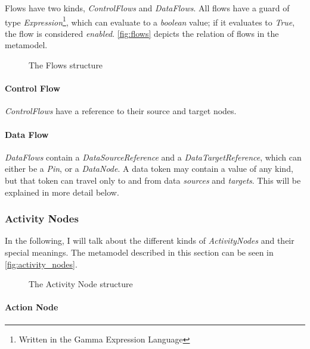 Flows have two kinds, \emph{ControlFlows} and \emph{DataFlows}. All flows have a guard of type \emph{Expression}\footnote{Written in the Gamma Expression Language}, which can evaluate to a \emph{boolean} value; if it evaluates to \emph{True}, the flow is considered \emph{enabled}. \autoref{fig:flows} depicts the relation of flows in the metamodel.

\begin{figure}[!ht]
	\centering
	
	\caption{The Flows structure}
	\label{fig:flows}
\end{figure}

\paragraph{Control Flow}

\emph{ControlFlows} have a reference to their source and target nodes.

\paragraph{Data Flow}\label{par:data_flow}

\emph{DataFlows} contain a \emph{DataSourceReference} and a \emph{DataTargetReference}, which can either be a \emph{Pin}, or a \emph{DataNode}. A data token may contain a value of any kind, but that token can travel only to and from data \emph{sources} and \emph{targets}. This will be explained in more detail below.

\subsubsection*{Activity Nodes}\label{ssec:activity_nodes}

In the following, I will talk about the different kinds of \emph{ActivityNodes} and their special meanings. The metamodel described in this section can be seen in \autoref{fig:activity_nodes}.

\begin{figure}[!ht]
	\centering
	
	\caption{The Activity Node structure}
	\label{fig:activity_nodes}
\end{figure}

\paragraph{Action Node}

